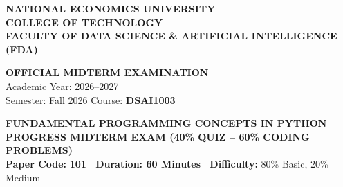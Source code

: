 \documentclass[11pt,a4paper]{article}
\begin{document}

\noindent
\begin{minipage}[t]{0.64\textwidth}
  \raggedright\small
  \textbf{NATIONAL ECONOMICS UNIVERSITY}\\
  \textbf{COLLEGE OF TECHNOLOGY}\\
  \textbf{FACULTY OF DATA SCIENCE \& ARTIFICIAL INTELLIGENCE (FDA)}
\end{minipage}%
\hfill
\begin{minipage}[t]{0.34\textwidth}
  \raggedleft\footnotesize
  \textbf{OFFICIAL MIDTERM EXAMINATION}\\
  Academic Year: 2026--2027\\
  Semester: Fall 2026 \quad Course: \textbf{DSAI1003}
\end{minipage}

\vspace{0.08em}

\begin{center}
  {\large\bfseries\color{primaryblue} FUNDAMENTAL PROGRAMMING CONCEPTS IN PYTHON}\\[0.04em]
  {\normalsize\bfseries PROGRESS MIDTERM EXAM (40\% QUIZ -- 60\% CODING PROBLEMS)}\\[0.04em]
  {\footnotesize\textbf{Paper Code:} \textbf{101} \quad | \quad \textbf{Duration: 60 Minutes} \quad | \quad \textbf{Difficulty:} 80\% Basic, 20\% Medium}
\end{center}

\vspace{0.04em}
\end{document}
